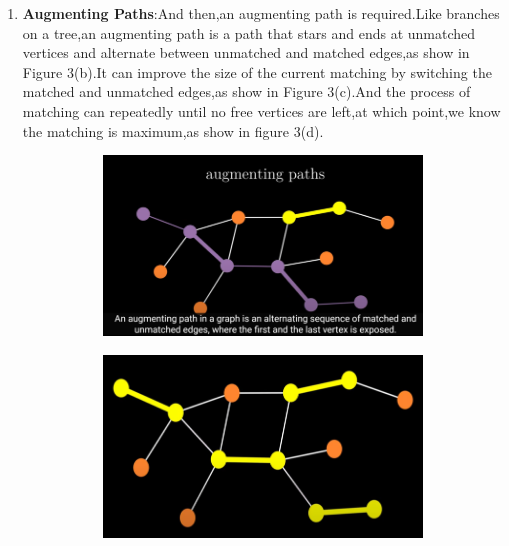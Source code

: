 \documentclass[
	a4paper, %
	10pt, %
	unnumberedsections, %
	twoside, %
]{LTJournalArticle}
\begin{document}
\begin{enumerate}
	\item \textbf{Augmenting Paths}:And then,an augmenting path is required.Like branches on a tree,an augmenting path is a path that stars and ends at unmatched vertices and alternate between unmatched and matched edges,as show in Figure 3(b).It can improve the size of the current matching by switching the matched and unmatched edges,as show in Figure 3(c).And the process of matching can repeatedly until no free vertices are left,at which point,we know the matching is maximum,as show in figure 3(d). 
	\begin{figure}[htbp] %
    \centering %
    \vspace{0cm} %
    \setlength{\abovecaptionskip}{0.cm} %
    \setlength{\belowcaptionskip}{0.cm} %
    \setlength{\belowdisplayskip}{3pt} %
	\begin{subfigure}[b]{0.45\linewidth}
        \includegraphics[width=\linewidth]{img/blossom algorithm 2.png}
        \caption{}
        \label{fig:subfig1}
    \end{subfigure}
    \hfill
    \begin{subfigure}[b]{0.45\linewidth}
        \includegraphics[width=\linewidth]{img/blossom algorithm 3.png}

\end{subfigure}
\end{figure}
\end{enumerate}
\end{document}
